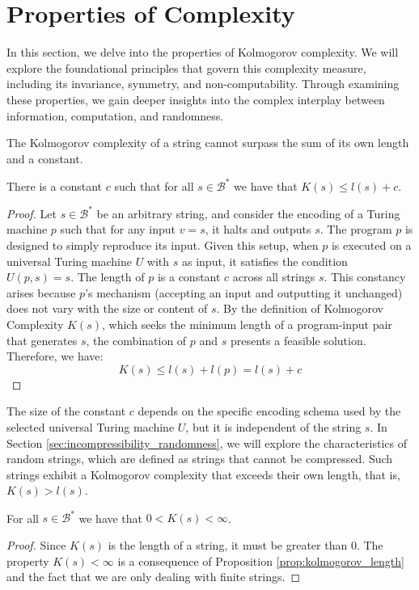 %
%

\section{Properties of Complexity}

In this section, we delve into the properties of Kolmogorov complexity. We will explore the foundational principles that govern this complexity measure, including its invariance, symmetry, and non-computability. Through examining these properties, we gain deeper insights into the complex interplay between information, computation, and randomness.

The Kolmogorov complexity of a string cannot surpass the sum of its own length and a constant.

\begin{proposition}
\label{prop:kolmogorov_length}
There is a constant $c$ such that for all $s\in\mathcal{B}^{\ast}$ we have that $K(s) \leq l(s) + c$.
\end{proposition}
\begin{proof}
Let $s \in \mathcal{B}^\ast$ be an arbitrary string, and consider the encoding of a Turing machine $p$ such that for any input $v = s$, it halts and outputs $s$. The program $p$ is designed to simply reproduce its input. Given this setup, when $p$ is executed on a universal Turing machine $U$ with $s$ as input, it satisfies the condition $U(p, s) = s$. The length of \(p\) is a constant $c$ across all strings $s$. This constancy arises because $p$'s mechanism (accepting an input and outputting it unchanged) does not vary with the size or content of $s$. By the definition of Kolmogorov Complexity $K(s)$, which seeks the minimum length of a program-input pair that generates $s$, the combination of $p$ and $s$ presents a feasible solution. Therefore, we have:
\[
K(s) \leq l(s) + l(p) = l(s) + c
\]
\end{proof}

The size of the constant $c$ depends on the specific encoding schema used by the selected universal Turing machine $U$, but it is independent of the string $s$. In Section \ref{sec:incompressibility_randomness}, we will explore the characteristics of random strings, which are defined as strings that cannot be compressed. Such strings exhibit a Kolmogorov complexity that exceeds their own length, that is, $K(s) > l(s)$.

\begin{proposition}
For all $s\in\mathcal{B}^{\ast}$ we have that $0 < K(s) < \infty$.
\end{proposition}
\begin{proof}
Since $K(s)$ is the length of a string, it must be greater than $0$. The property $K(s) < \infty$ is a consequence of Proposition \ref{prop:kolmogorov_length} and the fact that we are only dealing with finite strings.
\end{proof}


